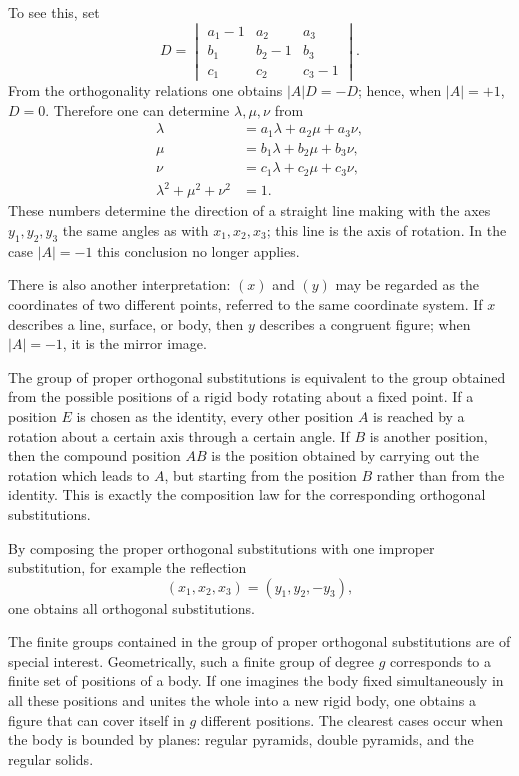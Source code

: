 \documentclass[11pt]{article}
\begin{document}
To see this, set
\[
 D=\begin{vmatrix}
 a_1-1&a_2&a_3\\
 b_1&b_2-1&b_3\\
 c_1&c_2&c_3-1
 \end{vmatrix}.
\]
From the orthogonality relations one obtains $|A|D=-D$; hence, when $|A|=+1$, $D=0$.  Therefore one can determine $\lambda,\mu,\nu$ from
\begin{equation}\label{eq:w9-axis}
\begin{aligned}
 \lambda&=a_1\lambda+a_2\mu+a_3\nu,\\
 \mu&=b_1\lambda+b_2\mu+b_3\nu,\\
 \nu&=c_1\lambda+c_2\mu+c_3\nu,\\
 \lambda^2+\mu^2+\nu^2&=1.
\end{aligned}
\end{equation}
These numbers determine the direction of a straight line making with the axes $y_1,y_2,y_3$ the same angles as with $x_1,x_2,x_3$; this line is the axis of rotation.  In the case $|A|=-1$ this conclusion no longer applies.

There is also another interpretation: $(x)$ and $(y)$ may be regarded as the coordinates of two different points, referred to the same coordinate system.  If $x$ describes a line, surface, or body, then $y$ describes a congruent figure; when $|A|=-1$, it is the mirror image.

The group of proper orthogonal substitutions is equivalent to the group obtained from the possible positions of a rigid body rotating about a fixed point.  If a position $E$ is chosen as the identity, every other position $A$ is reached by a rotation about a certain axis through a certain angle.  If $B$ is another position, then the compound position $AB$ is the position obtained by carrying out the rotation which leads to $A$, but starting from the position $B$ rather than from the identity.  This is exactly the composition law for the corresponding orthogonal substitutions.

By composing the proper orthogonal substitutions with one improper substitution, for example the reflection
\[
 (x_1,x_2,x_3)=(y_1,y_2,-y_3),
\]
one obtains all orthogonal substitutions.

The finite groups contained in the group of proper orthogonal substitutions are of special interest.  Geometrically, such a finite group of degree $g$ corresponds to a finite set of positions of a body.  If one imagines the body fixed simultaneously in all these positions and unites the whole into a new rigid body, one obtains a figure that can cover itself in $g$ different positions.  The clearest cases occur when the body is bounded by planes: regular pyramids, double pyramids, and the regular solids.
\end{document}
